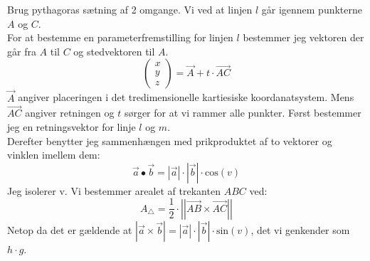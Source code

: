 \begin{tcolorbox}[title=Opgave 6,
    colback=blue!1!white,
    colframe=black,
    colbacktitle=blue!25!white,
    coltitle=red!25!black,
    fonttitle=\bfseries,
    subtitle style={boxrule=0.4pt,
    colback=blue!7!white} ]
        Brug pythagoras sætning af 2 omgange.
        Vi ved at linjen \(l\) går igennem punkterne \(A\) og \(C\).\\
        For at bestemme en parameterfremstilling for linjen \(l\) bestemmer jeg vektoren der går fra \(A\) til \(C\) og stedvektoren til \(A\).\\
        \[\begin{pmatrix} x\\y\\z \end{pmatrix}=\overrightarrow{A}+t\cdot \overrightarrow{AC}\]
        \(\overrightarrow{A}\) angiver placeringen i det tredimensionelle kartiesiske koordanatsystem. Mens \(\overrightarrow{AC}\) angiver retningen og \(t\) sørger for at vi rammer alle punkter.
        Først bestemmer jeg en retningsvektor for linje \(l\) og \(m\).\\
        Derefter benytter jeg sammenhængen med prikproduktet af to vektorer og vinklen imellem dem:
        \[\overrightarrow{a}\bullet \overrightarrow{b}=\left|\overrightarrow{a}\right|\cdot\left|\overrightarrow{b}\right|\cdot \text{cos}(v)\]
        Jeg isolerer v.
        Vi bestemmer arealet af trekanten \(ABC\) ved:
        \[A_\triangle=\frac{1}{2} \cdot \left|\left| \overrightarrow{AB} \times \overrightarrow{AC}\right|\right|\]
        Netop da det er gældende at \(\displaystyle \left|\overrightarrow{a} \times \overrightarrow{b} \right|=\left|\overrightarrow{a}\right|\cdot \left|\overrightarrow{b} \right|\cdot \text{sin}(v)\), det vi genkender som \(h\cdot g\). 
\end{tcolorbox}